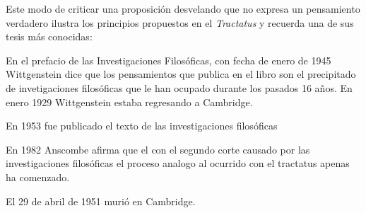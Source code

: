Este modo de criticar una proposición desvelando que no expresa un pensamiento
verdadero ilustra los principios propuestos en el \emph{Tractatus} y recuerda
una de sus tesis más conocidas: 



En el prefacio de las Investigaciones Filosóficas, con fecha de enero de 1945
Wittgenstein dice que los pensamientos que publica en el libro son el
precipitado de invetigaciones filosóficas que le han ocupado durante los pasados
16 años. En enero 1929 Wittgenstein estaba regresando a Cambridge.

En 1953 fue publicado el texto de las investigaciones filosóficas

En 1982 Anscombe afirma que el con el segundo corte causado por las
investigaciones filosóficas el proceso analogo al ocurrido con el tractatus
apenas ha comenzado.

El 29 de abril de 1951 murió en Cambridge. 
